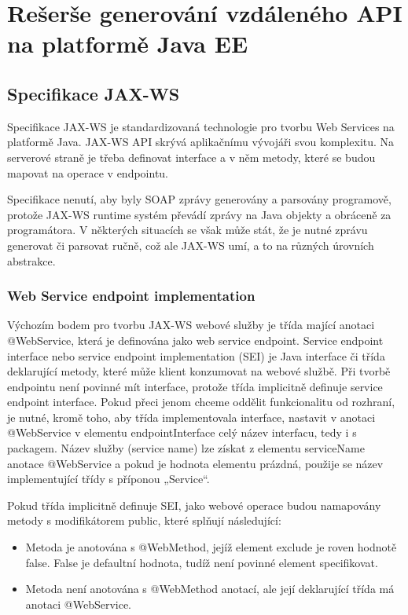 \documentclass[11pt,twoside,a4paper]{book}
\begin{document}
\section{Rešerše generování vzdáleného API na platformě Java EE}

\subsection{Specifikace JAX-WS}
Specifikace JAX-WS je standardizovaná technologie pro tvorbu Web Services na platformě
Java. JAX-WS API skrývá aplikačnímu vývojáři svou komplexitu. Na serverové straně je
třeba definovat interface a v něm metody, které se budou mapovat na operace v endpointu.

Specifikace nenutí, aby byly SOAP zprávy generovány a parsovány programově, protože
JAX-WS runtime systém převádí zprávy na Java objekty a obráceně za programátora. V
některých situacích se však může stát, že je nutné zprávu generovat či parsovat ručně, což ale
JAX-WS umí, a to na různých úrovních abstrakce.

\subsubsection{Web Service endpoint implementation}
Výchozím bodem pro tvorbu JAX-WS webové služby je třída mající anotaci @WebService,
která je definována jako web service endpoint. Service endpoint interface nebo service
endpoint implementation (SEI) je Java interface či třída deklarující metody, které může klient
konzumovat na webové službě. Při tvorbě endpointu není povinné mít interface, protože třída
implicitně definuje service endpoint interface. Pokud přeci jenom chceme oddělit
funkcionalitu od rozhraní, je nutné, kromě toho, aby třída implementovala interface, nastavit v
anotaci @WebService v elementu endpointInterface celý název interfacu, tedy i s packagem.
Název služby (service name) lze získat z elementu serviceName anotace @WebService a
pokud je hodnota elementu prázdná, použije se název implementující třídy s příponou
„Service“.

Pokud třída implicitně definuje SEI, jako webové operace budou namapovány metody s
modifikátorem public, které splňují následující:
\begin{itemize}
  \item Metoda je anotována s @WebMethod, jejíž element exclude je roven hodnotě false.
False je defaultní hodnota, tudíž není povinné element specifikovat.
  \item Metoda není anotována s @WebMethod anotací, ale její deklarující třída má anotaci
@WebService.
\end{itemize}
\end{document}
